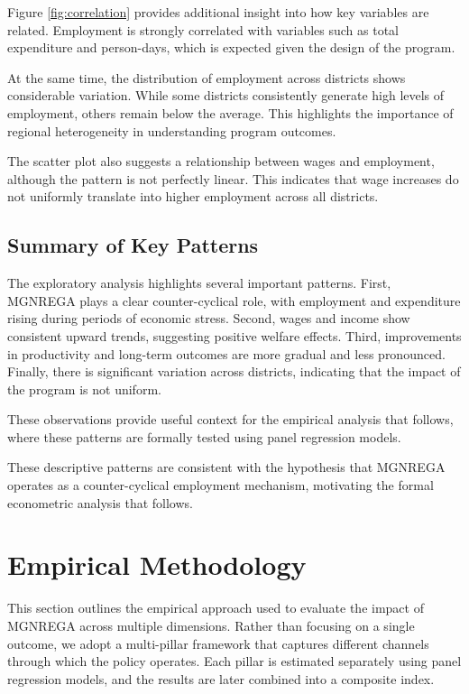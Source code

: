 \documentclass[12pt]{article}
\begin{document}
Figure \ref{fig:correlation} provides additional insight into how key variables are related. Employment is strongly correlated with variables such as total expenditure and person-days, which is expected given the design of the program.


At the same time, the distribution of employment across districts shows considerable variation. While some districts consistently generate high levels of employment, others remain below the average. This highlights the importance of regional heterogeneity in understanding program outcomes.

The scatter plot also suggests a relationship between wages and employment, although the pattern is not perfectly linear. This indicates that wage increases do not uniformly translate into higher employment across all districts.

\subsection{Summary of Key Patterns}

The exploratory analysis highlights several important patterns. First, MGNREGA plays a clear counter-cyclical role, with employment and expenditure rising during periods of economic stress. Second, wages and income show consistent upward trends, suggesting positive welfare effects. Third, improvements in productivity and long-term outcomes are more gradual and less pronounced. Finally, there is significant variation across districts, indicating that the impact of the program is not uniform.

These observations provide useful context for the empirical analysis that follows, where these patterns are formally tested using panel regression models.

These descriptive patterns are consistent with the hypothesis that MGNREGA operates as a counter-cyclical employment mechanism, motivating the formal econometric analysis that follows.


\section{Empirical Methodology}

This section outlines the empirical approach used to evaluate the impact of MGNREGA across multiple dimensions. Rather than focusing on a single outcome, we adopt a multi-pillar framework that captures different channels through which the policy operates. Each pillar is estimated separately using panel regression models, and the results are later combined into a composite index.
\end{document}
